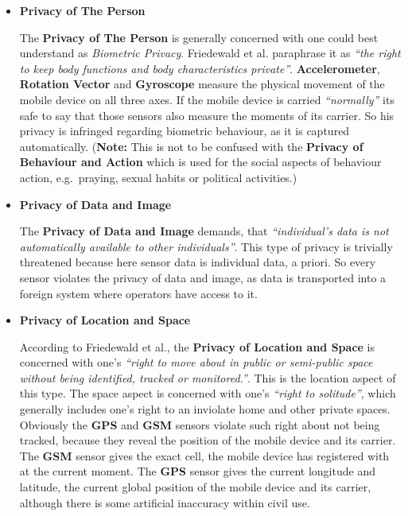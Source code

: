 \begin{itemize}

\item
\textbf{Privacy of The Person}

The \textbf{Privacy of The Person} is generally concerned with one could best understand as \emph{Biometric Privacy}.
Friedewald et al. paraphrase it as \emph{``\om the right to keep body functions and body characteristics \om private''}.
\textbf{Accelerometer}, \textbf{Rotation Vector} and \textbf{Gyroscope} measure the physical movement of the mobile device on all three axes.
If the mobile device is carried \emph{``normally''} its safe to say that those sensors also measure the moments of its carrier.
So his privacy is infringed regarding biometric behaviour, as it is captured automatically.
(\textbf{Note:} This is not to be confused with the \textbf{Privacy of Behaviour and Action} which is used for the social aspects of behaviour action, e.g.~praying, sexual habits or political activities.)

\item \textbf{Privacy of Data and Image}

The \textbf{Privacy of Data and Image} demands, that \emph{``individual's data is not automatically available to other individuals''}.
This type of privacy is trivially threatened because here sensor data is individual data, a priori.
So every sensor violates the privacy of data and image, as data is transported into a foreign system where operators have access to it.

\item \textbf{Privacy of Location and Space}

According to Friedewald et al., the \textbf{Privacy of Location and Space} is concerned with one's \emph{``right to move about in public or semi-public space without being identified, tracked or monitored.''}.
This is the location aspect of this type. The space aspect is concerned with one's \emph{``right to solitude''}, which generally includes one's right to an inviolate home and other private spaces.
Obviously the \textbf{GPS} and \textbf{GSM} sensors violate such right about not being tracked, because they reveal the position of the mobile device and its carrier.
The \textbf{GSM} sensor gives the exact cell, the mobile device has registered with at the current moment.
The \textbf{GPS} sensor gives the current longitude and latitude, the current global position of the mobile device and its carrier, although there is some artificial inaccuracy within civil use.


\end{itemize}
